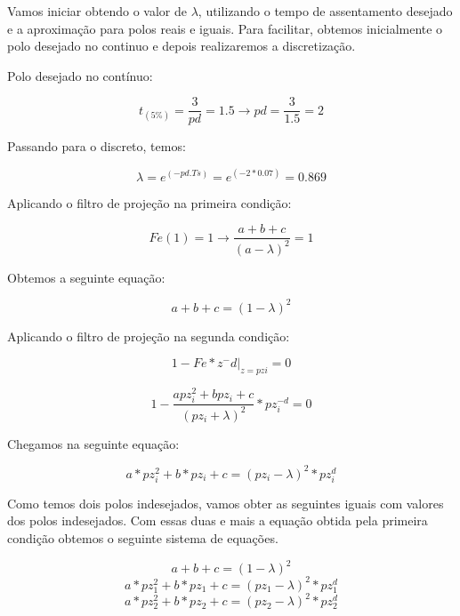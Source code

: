 \documentclass[a4paper,12pt]{article}
\begin{document}
Vamos iniciar obtendo o valor de \(\lambda\), utilizando o tempo de assentamento desejado e a aproximação para polos reais e iguais. Para facilitar, obtemos inicialmente o polo desejado  no continuo e depois realizaremos a discretização.


Polo desejado no contínuo:

\begin{equation}
t_{(5\%)} = \frac{3}{pd} = 1.5 \xrightarrow{} pd = \frac{3}{1.5} = 2
\end{equation}

Passando para o discreto, temos:

\begin{equation}
\lambda = e^{(-pd.Ts)} = e^{(-2*0.07)} = 0.869
\end{equation}

Aplicando o filtro de projeção na primeira condição:

\begin{equation}
Fe(1) = 1 → \frac{a+b+c}{(a-\lambda)^2} = 1
\end{equation}

Obtemos a seguinte equação:

\begin{equation}
a+b+c = (1-\lambda)^2
\end{equation}

Aplicando o filtro de projeção na segunda condição:

\begin{equation}
1-Fe * z ^-d |_{z=pzi} = 0
\end{equation}

\begin{equation}
1-\frac{apz^2_i + bpz_i + c}{(pz_i + \lambda)^2} * pz^{-d}_i = 0
\end{equation}

Chegamos na seguinte equação:

\begin{equation}
a * pz^2_i + b*pz_i + c = (pz_i - \lambda)^2 * pz^d_i
\end{equation}

Como temos dois polos indesejados, vamos obter as seguintes iguais com valores dos polos indesejados. Com essas duas e mais a equação obtida pela primeira condição obtemos o seguinte sistema de equações.

\begin{equation}
a + b + c = (1 - \lambda)^2
\end{equation}
\begin{equation}
a * pz^2_1 + b * pz_1 + c = (pz_1 - \lambda)^2 * pz^d_1
\end{equation}
\begin{equation}
a * pz^2_2 + b * pz_2 + c = (pz_2 - \lambda)^2 * pz^d_2
\end{equation}\\
\end{document}

